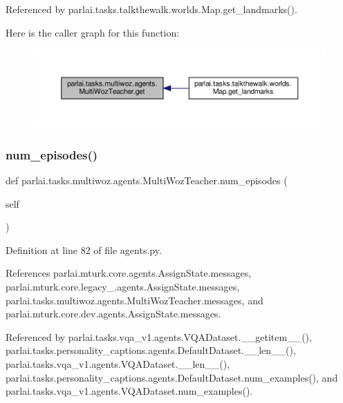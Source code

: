 Referenced by parlai.\+tasks.\+talkthewalk.\+worlds.\+Map.\+get\+\_\+landmarks().

Here is the caller graph for this function\+:
\nopagebreak
\begin{figure}[H]
\begin{center}
\leavevmode
\includegraphics[width=350pt]{classparlai_1_1tasks_1_1multiwoz_1_1agents_1_1MultiWozTeacher_acca718e7c3409e583f161f45956fe486_icgraph}
\end{center}
\end{figure}
\mbox{\label{classparlai_1_1tasks_1_1multiwoz_1_1agents_1_1MultiWozTeacher_a0b28fec07160f7a36bc820fb74baf5b2}} 
\subsubsection{\texorpdfstring{num\+\_\+episodes()}{num\_episodes()}}
{\footnotesize\ttfamily def parlai.\+tasks.\+multiwoz.\+agents.\+Multi\+Woz\+Teacher.\+num\+\_\+episodes (\begin{DoxyParamCaption}\item[{}]{self }\end{DoxyParamCaption})}



Definition at line 82 of file agents.\+py.



References parlai.\+mturk.\+core.\+agents.\+Assign\+State.\+messages, parlai.\+mturk.\+core.\+legacy\+\_.\+agents.\+Assign\+State.\+messages, parlai.\+tasks.\+multiwoz.\+agents.\+Multi\+Woz\+Teacher.\+messages, and parlai.\+mturk.\+core.\+dev.\+agents.\+Assign\+State.\+messages.



Referenced by parlai.\+tasks.\+vqa\+\_\+v1.\+agents.\+V\+Q\+A\+Dataset.\+\_\+\+\_\+getitem\+\_\+\+\_\+(), parlai.\+tasks.\+personality\+\_\+captions.\+agents.\+Default\+Dataset.\+\_\+\+\_\+len\+\_\+\+\_\+(), parlai.\+tasks.\+vqa\+\_\+v1.\+agents.\+V\+Q\+A\+Dataset.\+\_\+\+\_\+len\+\_\+\+\_\+(), parlai.\+tasks.\+personality\+\_\+captions.\+agents.\+Default\+Dataset.\+num\+\_\+examples(), and parlai.\+tasks.\+vqa\+\_\+v1.\+agents.\+V\+Q\+A\+Dataset.\+num\+\_\+examples().

